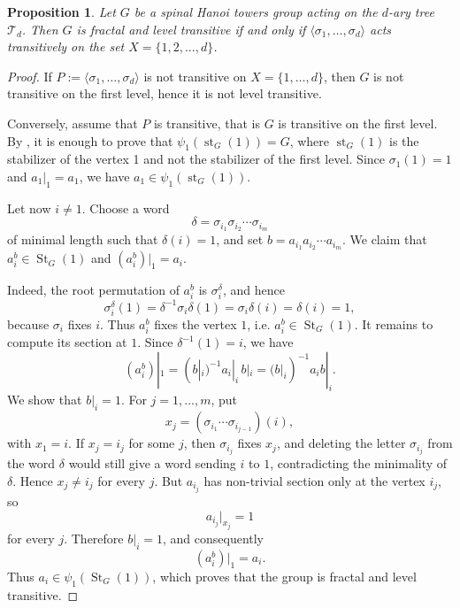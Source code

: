 \documentclass[11pt,leqno]{amsart}
\theoremstyle{plain}
\newtheorem{proposition}[proposition]{Proposition}
\newcommand\T{{\mathcal{T}}}
\DeclareMathOperator{\St}{St}
\DeclareMathOperator{\st}{st}
\numberwithin{equation}{section}
\begin{document}
\begin{proposition}\label{fractandtrans} Let $G$ be a spinal Hanoi towers group acting on the $d$-ary tree $\T_d$. Then $G$ is fractal and level transitive if and only if $\langle\sigma_1,\dots,\sigma_d\rangle$ acts transitively on the set $X=\{1,2,\dots,d\}$.
\end{proposition}
\begin{proof}
If $P:=\langle \sigma_1,\ldots,\sigma_d\rangle$ is not transitive on
$X=\{1,\ldots,d\}$, then $G$ is not transitive on the first level, hence
it is not level transitive.

Conversely, assume that $P$ is transitive, that is $G$ is transitive on the first level. 
By \cite[Lemma 2.7]{fractality}, it is
enough to prove that $\psi_1(\st_G(1))=G$, where $\st_{G}({1})$ is the stabilizer of the vertex 1 and not the stabilizer of the first level. Since
$\sigma_1(1)=1$ and $a_1|_1=a_1$, we have
$a_1\in \psi_1(\st_G(1))$.

Let now $i\neq 1$. Choose a word
\[
        \delta=\sigma_{i_1}\sigma_{i_2}\cdots \sigma_{i_m}
\]
of minimal length such that $\delta(i)=1$, and set
$b=a_{i_1}a_{i_2}\cdots a_{i_m}$. We claim that $a_i^b\in
\St_G(1)$ and $(a_i^b)|_1=a_i$.

Indeed, the root permutation of $a_i^b$ is $\sigma_i^\delta$, and hence
\[
        \sigma_i^\delta(1)
        =\delta^{-1}\sigma_i\delta(1)
        =\sigma_i\delta(i)
        =\delta(i)
        =1,
\]
because $\sigma_i$ fixes $i$. Thus $a_i^b$ fixes the vertex $1$, i.e. $a_i^b\in
\St_G(1)$. It remains to compute its section at $1$. Since $\delta^{-1}(1)=i$, we have
\[
        (a_i^b)|_1
        = (b|_i)^{-1} a_i|_i\, b|_i
        = (b|_i)^{-1} a_i b|_i .
\]
We show that $b|_i=1$. For $j=1,\ldots,m$, put
\[
        x_j=(\sigma_{i_1}\cdots\sigma_{i_{j-1}})(i),
\]
with $x_1=i$. If $x_j=i_j$ for some $j$, then $\sigma_{i_j}$ fixes
$x_j$, and deleting the letter $\sigma_{i_j}$ from the word $\delta$
would still give a word sending $i$ to $1$, contradicting the minimality
of $\delta$. Hence $x_j\neq i_j$ for every $j$. But $a_{i_j}$ has
non-trivial section only at the vertex $i_j$, so
\[
        a_{i_j}|_{x_j}=1
\]
for every $j$. Therefore $b|_i=1$, and consequently
\[
        (a_i^b)|_1=a_i.
\]
Thus $a_i\in \psi_1(\St_G(1))$, which proves that the group is fractal and level transitive.
\end{proof}
\end{document}
